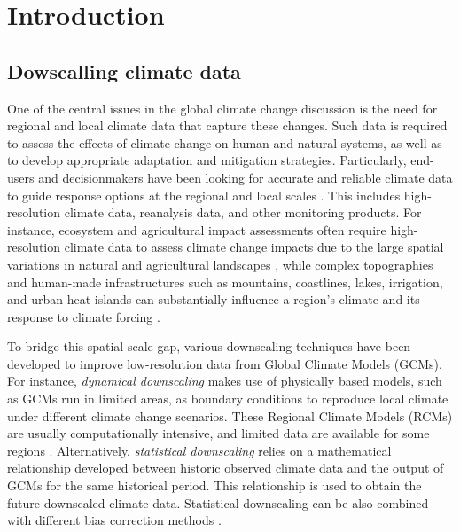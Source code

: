 \documentclass[
]{book}
\begin{document}
\hypertarget{introduction}{%
\chapter{Introduction}\label{introduction}}

\hypertarget{dowscalling-climate-data}{%
\section{Dowscalling climate data}\label{dowscalling-climate-data}}

One of the central issues in the global climate change discussion is the need for regional and local climate data that capture these changes. Such data is required to assess the effects of climate change on human and natural systems, as well as to develop appropriate adaptation and mitigation strategies. Particularly, end-users and decisionmakers have been looking for accurate and reliable climate data to guide response options at the regional and local scales \citep{Overpeck2011, Roberts2018}. This includes high-resolution climate data, reanalysis data, and other monitoring products. For instance, ecosystem and agricultural impact assessments often require high-resolution climate data to assess climate change impacts due to the large spatial variations in natural and agricultural landscapes \citep{NavarroRacines2020, Lafferty2021}, while complex topographies and human-made infrastructures such as mountains, coastlines, lakes, irrigation, and urban heat islands can substantially influence a region's climate and its response to climate forcing \citep{Smid2017, Gutowski2020}.

To bridge this spatial scale gap, various downscaling techniques have been developed to improve low-resolution data from Global Climate Models (GCMs). For instance, \emph{dynamical downscaling} makes use of physically based models, such as GCMs run in limited areas, as boundary conditions to reproduce local climate under different climate change scenarios. These Regional Climate Models (RCMs) are usually computationally intensive, and limited data are available for some regions \citep{DiLuca2015}. Alternatively, \emph{statistical downscaling} relies on a mathematical relationship developed between historic observed climate data and the output of GCMs for the same historical period. This relationship is used to obtain the future downscaled climate data. Statistical downscaling can be also combined with different bias correction methods \citep{Can2015, Wer2016}.
\end{document}

